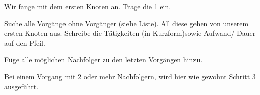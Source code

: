 \documentclass{beamer}
\begin{document}
\begin{frame}[t,shrink=65]
\begin{itemize}
{\huge
    \item<only@+> {Wir fange mit dem ersten Knoten an. Trage die 1 ein.}
    \item<only@+> {Suche alle Vorgänge ohne Vorgänger (siehe Liste). All diese gehen von unserem ersten Knoten aus. Schreibe die Tätigkeiten (in Kurzform)sowie Aufwand/ Dauer auf den Pfeil.}
    \item<only@+> {Füge alle möglichen Nachfolger zu den letzten Vorgängen hinzu.}
    \item \alert<+> {Bei einem Vorgang mit 2 oder mehr Nachfolgern, wird hier wie gewohnt Schritt 3 ausgeführt.}
}

\end{itemize}

\end{frame}
\end{document}
